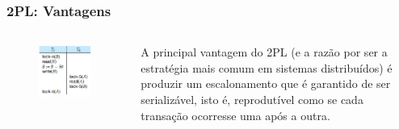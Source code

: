 \documentclass{beamer}
\begin{document}

\begin{frame} %
    \frametitle{2PL: Vantagens}

    \begin{columns}[c] %
    
            \begin{figure}
                \includegraphics[width=0.8\linewidth]{example6.png}
            \end{figure}
        
        
        A principal vantagem do 2PL (e a razão por ser a estratégia mais comum em sistemas distribuídos) é produzir um escalonamento que é garantido de ser serializável, isto é, reprodutível como se cada transação ocorresse uma após a outra.
    \end{columns}
    
\end{frame}
\end{document}
